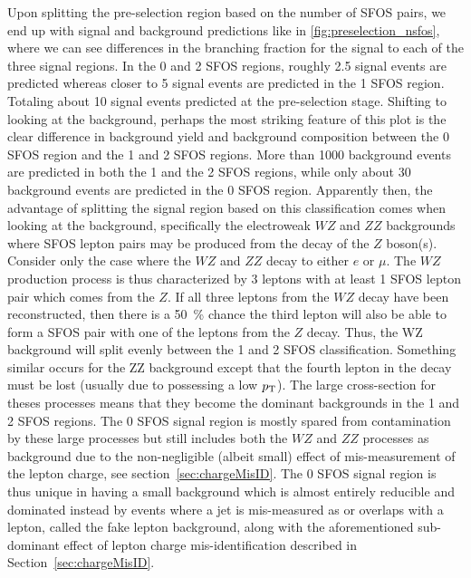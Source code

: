 Upon splitting the pre-selection region based on the number of SFOS
pairs, we end up with signal and background predictions like in 
\fig\ref{fig:preselection_nsfos}, where we can see differences
in the branching fraction for the signal to each of the three signal regions.
In the 0 and 2 SFOS regions, roughly 2.5 signal events are predicted
whereas closer to 5 signal events are predicted in the 1 SFOS region. 
Totaling about 10 signal events predicted at the pre-selection stage.
Shifting to looking at the background, perhaps the most striking 
feature of this plot is the 
clear difference in background yield and background composition
between the 0 SFOS region and the 1 and 2 SFOS regions.
More than 1000 background events are predicted in both the 1 and
the 2 SFOS regions, while only about 30 background events are
predicted in the 0 SFOS region.
Apparently then, the advantage of splitting the signal region based on this
classification comes when looking at the background, specifically the
electroweak $WZ$ and $ZZ$ backgrounds where SFOS lepton pairs may be
produced from the decay of the $Z$ boson(s). Consider only the case
where the $WZ$ and $ZZ$ decay to either $e$ or $\mu$.  The $WZ$ production
process is thus characterized by 3 leptons with at least 1 SFOS lepton pair
which comes from the $Z$. If all three leptons from the $WZ$ decay have been
reconstructed, then there is a 50~\% chance the third lepton 
will also be able to form a SFOS pair with one of the leptons from the $Z$ decay.
Thus, the WZ background will split evenly between the 1 and 2 SFOS classification.
Something similar occurs for the ZZ background except that the fourth lepton 
in the decay must be lost (usually due to possessing a low $p_{\mathrm{T}}$).
The large cross-section for theses processes means that
they become the dominant backgrounds in the 1 and 2 SFOS regions.  
The 0 SFOS signal region is mostly spared from contamination  by 
these large processes but still
includes both the $WZ$ and $ZZ$ processes as background due to the
non-negligible (albeit small) effect of mis-measurement of the lepton
charge, see section~\ref{sec:chargeMisID}.  The 0 SFOS signal region
is thus unique in having a small background which is almost entirely
reducible and dominated instead by events where a jet is mis-measured
as or overlaps with a lepton, called the fake lepton background, along
with the aforementioned sub-dominant effect of lepton charge 
mis-identification described in Section~\ref{sec:chargeMisID}.  



